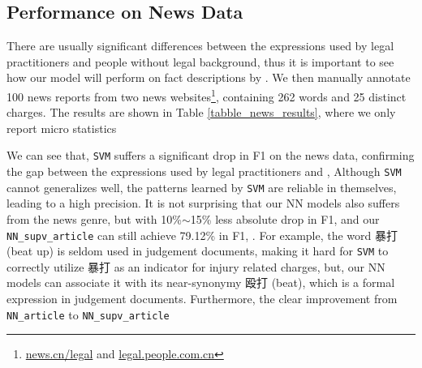 \subsection{Performance on News Data}
There are usually significant differences between the expressions used by legal practitioners and people without legal background, 
thus it is important to see how our model will perform on fact descriptions  by .
%
We then manually annotate 100 news reports %
from two news websites\footnote{\url{news.cn/legal} and \url{legal.people.com.cn}},
containing 262 words  and 25 distinct charges.
%
The results are shown in Table \ref{tabble_news_results}, where we only report micro statistics 

We can see that, \texttt{SVM} suffers a significant drop in F1 on the news data, %
confirming the gap between the expressions used by legal practitioners and ,
Although \texttt{SVM} cannot generalizes well, the patterns learned by \texttt{SVM} are reliable in themselves, leading to a high precision.
It is not surprising that our NN models also suffers from the news genre, but with 10\%$\sim$15\% less absolute drop in F1, and our  \texttt{NN\_supv\_article} can still achieve 79.12\% in F1, .
For example, the word 暴打 (beat up) is seldom used in judgement documents,
making it hard for \texttt{SVM} to correctly utilize  暴打 as an indicator for injury related charges, but, %
our NN models can associate it with its  near-synonymy  殴打 (beat), which is a formal expression in judgement documents.
Furthermore, the clear improvement from \texttt{NN\_article} to \texttt{NN\_supv\_article} 

